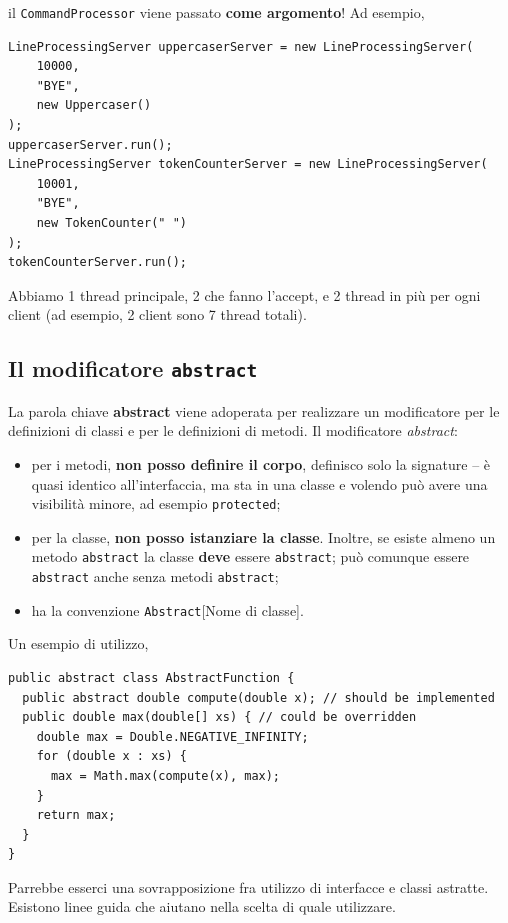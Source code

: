 \documentclass[\fontsizeclass,twocolumn]{\classname}
\theoremstyle{definition}
\theoremstyle{definition}
\begin{document}
il \texttt{CommandProcessor} viene passato \textbf{come argomento}! Ad esempio,

\begin{lstlisting}
LineProcessingServer uppercaserServer = new LineProcessingServer(
    10000,
    "BYE",
    new Uppercaser()
);
uppercaserServer.run();
LineProcessingServer tokenCounterServer = new LineProcessingServer(
    10001,
    "BYE",
    new TokenCounter(" ")
);
tokenCounterServer.run();
\end{lstlisting}

Abbiamo 1 thread principale, 2 che fanno l'accept, e 2 thread in più per ogni
client (ad esempio, 2 client sono 7 thread totali).

\subsection{Il modificatore \texttt{abstract}}

La parola chiave \textbf{abstract} viene adoperata per realizzare un modificatore per le definizioni di classi e per le definizioni di metodi. Il modificatore \emph{abstract}:
\begin{itemize}
    \item per i metodi, \textbf{non posso definire il corpo}, definisco solo la
        signature -- è quasi identico all'interfaccia, ma sta in una classe e
        volendo può avere una visibilità minore, ad esempio \texttt{protected};
    \item per la classe, \textbf{non posso istanziare la classe}. Inoltre, se
        esiste almeno un metodo \texttt{abstract} la classe \textbf{deve}
        essere \texttt{abstract}; può comunque essere \texttt{abstract} anche
        senza metodi \texttt{abstract};
    \item ha la convenzione \texttt{Abstract}[Nome di classe].
\end{itemize}

Un esempio di utilizzo,

\begin{lstlisting}
public abstract class AbstractFunction {
  public abstract double compute(double x); // should be implemented
  public double max(double[] xs) { // could be overridden
    double max = Double.NEGATIVE_INFINITY;
    for (double x : xs) {
      max = Math.max(compute(x), max);
    }
    return max;
  }
}
\end{lstlisting}

Parrebbe esserci una sovrapposizione fra utilizzo di interfacce e classi
astratte. Esistono linee guida che aiutano nella scelta di quale utilizzare. 
\end{document}
